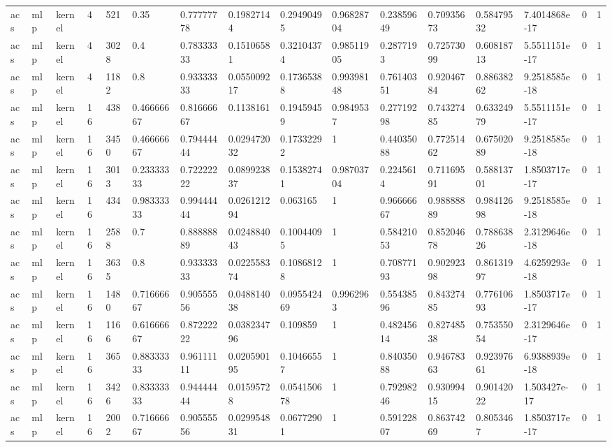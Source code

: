 \begin{tabular}{llllllllllllllll}
acs & mlp & kernel & 4 & 521 & 0.35 & 0.77777778 & 0.19827144 & 0.29490495 & 0.96828704 & 0.23859649 & 0.70935673 & 0.58479532 & 7.4014868e-17 & 0 & 1 \\
acs & mlp & kernel & 4 & 3028 & 0.4 & 0.78333333 & 0.15106581 & 0.32104374 & 0.98511905 & 0.2877193 & 0.72573099 & 0.60818713 & 5.5511151e-17 & 0 & 1 \\
acs & mlp & kernel & 4 & 1182 & 0.8 & 0.93333333 & 0.055009217 & 0.17365388 & 0.99398148 & 0.76140351 & 0.92046784 & 0.88638262 & 9.2518585e-18 & 0 & 1 \\
acs & mlp & kernel & 16 & 438 & 0.46666667 & 0.81666667 & 0.1138161 & 0.19459459 & 0.9849537 & 0.27719298 & 0.74327485 & 0.63324979 & 5.5511151e-17 & 0 & 1 \\
acs & mlp & kernel & 16 & 3450 & 0.46666667 & 0.79444444 & 0.029472032 & 0.17332292 & 1 & 0.44035088 & 0.77251462 & 0.67502089 & 9.2518585e-18 & 0 & 1 \\
acs & mlp & kernel & 16 & 3013 & 0.23333333 & 0.72222222 & 0.089923837 & 0.15382741 & 0.98703704 & 0.2245614 & 0.71169591 & 0.58813701 & 1.8503717e-17 & 0 & 1 \\
acs & mlp & kernel & 16 & 434 & 0.98333333 & 0.99444444 & 0.026121294 & 0.063165 & 1 & 0.96666667 & 0.98888889 & 0.98412698 & 9.2518585e-18 & 0 & 1 \\
acs & mlp & kernel & 16 & 2588 & 0.7 & 0.88888889 & 0.024884043 & 0.10044095 & 1 & 0.58421053 & 0.85204678 & 0.78863826 & 2.3129646e-18 & 0 & 1 \\
acs & mlp & kernel & 16 & 3635 & 0.8 & 0.93333333 & 0.022558374 & 0.10868128 & 1 & 0.70877193 & 0.90292398 & 0.86131997 & 4.6259293e-18 & 0 & 1 \\
acs & mlp & kernel & 16 & 1480 & 0.71666667 & 0.90555556 & 0.048814038 & 0.095542469 & 0.9962963 & 0.55438596 & 0.84327485 & 0.77610693 & 1.8503717e-17 & 0 & 1 \\
acs & mlp & kernel & 16 & 1166 & 0.61666667 & 0.87222222 & 0.038234796 & 0.109859 & 1 & 0.48245614 & 0.82748538 & 0.75355054 & 2.3129646e-17 & 0 & 1 \\
acs & mlp & kernel & 16 & 365 & 0.88333333 & 0.96111111 & 0.020590195 & 0.10466557 & 1 & 0.84035088 & 0.94678363 & 0.92397661 & 6.9388939e-18 & 0 & 1 \\
acs & mlp & kernel & 16 & 3426 & 0.83333333 & 0.94444444 & 0.01595728 & 0.054150678 & 1 & 0.79298246 & 0.93099415 & 0.90142022 & 1.503427e-17 & 0 & 1 \\
acs & mlp & kernel & 16 & 2002 & 0.71666667 & 0.90555556 & 0.029954831 & 0.06772901 & 1 & 0.59122807 & 0.86374269 & 0.8053467 & 1.8503717e-17 & 0 & 1 \\

\end{tabular}
